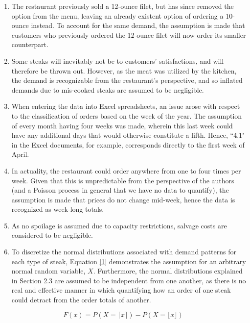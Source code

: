 \documentclass[12pt,a4paper]{article}
\begin{document}
\begin{enumerate}
\item The restaurant previously sold a 12-ounce filet, but has since removed the option from the menu, leaving an already existent option of ordering a 10-ounce instead. To account for the same demand, the assumption is made that customers who previously ordered the 12-ounce filet will now order its smaller counterpart.

\item Some steaks will inevitably not be to customers' satisfactions, and will therefore be thrown out. However, as the meat was utilized by the kitchen, the demand is recognizable from the restaurant's perspective, and so inflated demands due to mis-cooked steaks are assumed to be negligible.

\item When entering the data into Excel spreadsheets, an issue arose with respect to the classification of orders based on the week of the year. The assumption of every month having four weeks was made, wherein this last week could have any additional days that would otherwise constitute a fifth. Hence, ``4.1" in the Excel documents, for example, corresponds directly to the first week of April.

\item In actuality, the restaurant could order anywhere from one to four times per week. Given that this is unpredictable from the perspective of the authors (and a Poisson process in general that we have no data to quantify), the assumption is made that prices do not change mid-week, hence the data is recognized as week-long totals.

\item As no spoilage is assumed due to capacity restrictions, salvage costs are considered to be negligible.

\item To discretize the normal distributions associated with demand patterns for each type of steak, Equation \ref{1} demonstrates the assumption for an arbitrary normal random variable, $X$. Furthermore, the normal distributions explained in Section 2.3 are assumed to be independent from one another, as there is no real and effective manner in which quantifying how an order of one steak could detract from the order totals of another.
\end{enumerate}

\begin{equation} \label{1}
F(x) = P(X = \lceil x \rceil) - P(X = \lfloor x \rfloor)
\end{equation}
\end{document}
